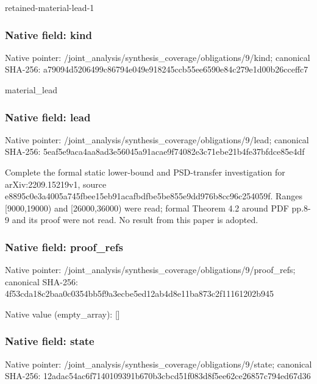 \documentclass[10pt,a4paper]{article}
\begin{document}
\begingroup\raggedright\sloppy retained-material-lead-1\par\endgroup

\subsubsection{Native field: kind}
Native pointer: /joint\_\allowbreak{}analysis/synthesis\_\allowbreak{}coverage/obligations/9/kind; canonical SHA-256: a79094d5206499c86794e049e918245ccb55ee6590e84c279e1d00b26cceffc7

\begingroup\raggedright\sloppy material\_\allowbreak{}lead\par\endgroup

\subsubsection{Native field: lead}
Native pointer: /joint\_\allowbreak{}analysis/synthesis\_\allowbreak{}coverage/obligations/9/lead; canonical SHA-256: 5eaf5e9aca4aa8ad3e56045a91acae9f74082e3c71ebe21b4fe37bfdce85e4df

\begingroup\raggedright\sloppy Complete the formal static lower-bound and PSD-transfer investigation for arXiv:\allowbreak{}2209.15219v1,\allowbreak{} source e8895c0e3a4005a745fbee15eb91acafbdfbe5be855e9dd976b8cc96c254059f. Ranges [9000,\allowbreak{}19000) and [26000,\allowbreak{}36000) were read;\allowbreak{} formal Theorem 4.2 around PDF pp.8-9 and its proof were not read. No result from this paper is adopted.\par\endgroup

\subsubsection{Native field: proof\_\allowbreak{}refs}
Native pointer: /joint\_\allowbreak{}analysis/synthesis\_\allowbreak{}coverage/obligations/9/proof\_\allowbreak{}refs; canonical SHA-256: 4f53cda18c2baa0c0354bb5f9a3ecbe5ed12ab4d8e11ba873c2f11161202b945

Native value (empty\_\allowbreak{}array): []

\subsubsection{Native field: state}
Native pointer: /joint\_\allowbreak{}analysis/synthesis\_\allowbreak{}coverage/obligations/9/state; canonical SHA-256: 12adac54ac6f7140109391b670b3cbcd51f083d8f5ee62ce26857c794ed67d36
\end{document}
